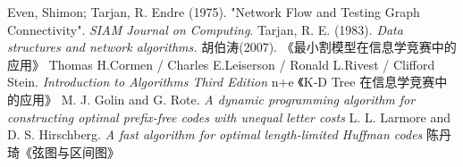 \begin{thebibliography}{999}
	 Even, Shimon; Tarjan, R. Endre (1975).
	"Network Flow and Testing Graph Connectivity".
    \emph{SIAM Journal on Computing}.
     Tarjan, R. E. (1983).
    \emph{Data structures and network algorithms.}
    胡伯涛(2007). 《最小割模型在信息学竞赛中的应用》
      Thomas H.Cormen / Charles E.Leiserson /
     Ronald L.Rivest / Clifford Stein.
     \emph{Introduction to Algorithms Third Edition}
    n+e 《K-D Tree 在信息学竞赛中的应用》
    M. J. Golin and G. Rote.
    \emph{A dynamic programming algorithm for constructing optimal
    prefix-free codes with unequal letter costs}
    L. L. Larmore and D. S. Hirschberg.
    \emph{A fast algorithm for optimal length-limited Huffman codes}
     陈丹琦《弦图与区间图》
\end{thebibliography}
